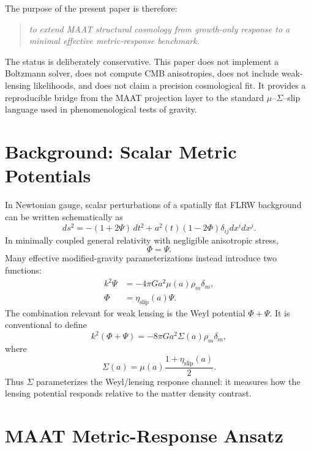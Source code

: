 \documentclass[11pt,a4paper]{article}
\newcommand{\etaslip}{\eta_{\mathrm{slip}}}
\begin{document}
The purpose of the present paper is therefore:
\begin{quote}
\emph{to extend MAAT structural cosmology from growth-only response to a
minimal effective metric-response benchmark.}
\end{quote}

The status is deliberately conservative.
This paper does not implement a Boltzmann solver, does not compute CMB
anisotropies, does not include weak-lensing likelihoods, and does not claim a
precision cosmological fit.
It provides a reproducible bridge from the MAAT projection layer to the
standard $\mu$--$\Sigma$--slip language used in phenomenological tests of
gravity.

\section{Background: Scalar Metric Potentials}

In Newtonian gauge, scalar perturbations of a spatially flat FLRW background
can be written schematically as
\begin{equation}
ds^2
=
-(1+2\Psi)\,dt^2
+
a^2(t)(1-2\Phi)\delta_{ij}dx^i dx^j .
\end{equation}
In minimally coupled general relativity with negligible anisotropic stress,
\begin{equation}
\Phi=\Psi.
\end{equation}
Many effective modified-gravity parameterizations instead introduce two
functions:
\begin{align}
k^2\Psi
&=
-4\pi G a^2 \mu(a)\rho_m\delta_m,\\
\Phi
&=
\etaslip(a)\Psi.
\end{align}
The combination relevant for weak lensing is the Weyl potential
$\Phi+\Psi$.
It is conventional to define
\begin{equation}
k^2(\Phi+\Psi)
=
-8\pi G a^2 \Sigma(a)\rho_m\delta_m,
\end{equation}
where
\begin{equation}
\Sigma(a)
=
\mu(a)\frac{1+\etaslip(a)}{2}.
\label{eq:sigma_def}
\end{equation}
Thus $\Sigma$ parameterizes the Weyl/lensing response channel: it measures how
the lensing potential responds relative to the matter density contrast.

\section{MAAT Metric-Response Ansatz}
\end{document}
